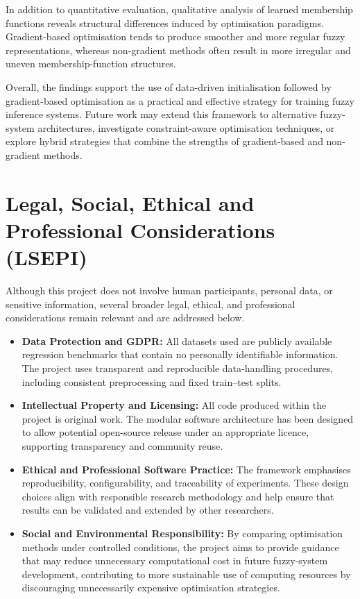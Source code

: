\documentclass[a4paper,12pt,oneside]{article}
\begin{document}
In addition to quantitative evaluation, qualitative analysis of learned membership functions reveals structural differences induced by optimisation paradigms. Gradient-based optimisation tends to produce smoother and more regular fuzzy representations, whereas non-gradient methods often result in more irregular and uneven membership-function structures.

Overall, the findings support the use of data-driven initialisation followed by gradient-based optimisation as a practical and effective strategy for training fuzzy inference systems. Future work may extend this framework to alternative fuzzy-system architectures, investigate constraint-aware optimisation techniques, or explore hybrid strategies that combine the strengths of gradient-based and non-gradient methods.


\newpage
\section{Legal, Social, Ethical and Professional Considerations (LSEPI)}

Although this project does not involve human participants, personal data, or sensitive information, several broader legal, ethical, and professional considerations remain relevant and are addressed below.

\begin{itemize}
    \item \textbf{Data Protection and GDPR:}  
    All datasets used are publicly available regression benchmarks that contain no personally identifiable information. The project uses transparent and reproducible data-handling procedures, including consistent preprocessing and fixed train--test splits.

    \item \textbf{Intellectual Property and Licensing:}  
    All code produced within the project is original work. The modular software architecture has been designed to allow potential open-source release under an appropriate licence, supporting transparency and community reuse.

    \item \textbf{Ethical and Professional Software Practice:}  
    The framework emphasises reproducibility, configurability, and traceability of experiments. These design choices align with responsible research methodology and help ensure that results can be validated and extended by other researchers.

    \item \textbf{Social and Environmental Responsibility:}  
    By comparing optimisation methods under controlled conditions, the project aims to provide guidance that may reduce unnecessary computational cost in future fuzzy-system development, contributing to more sustainable use of computing resources by discouraging unnecessarily expensive optimisation strategies.
\end{itemize}
\end{document}
